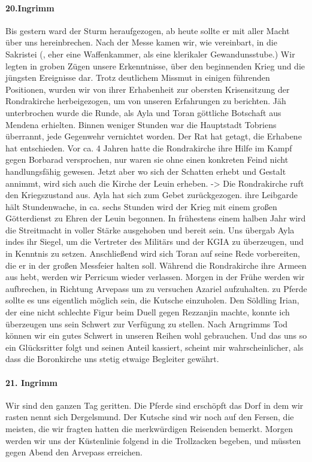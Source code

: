 \paragraph{20.Ingrimm}
Bis gestern ward der Sturm heraufgezogen, ab heute sollte er mit aller Macht über uns hereinbrechen.
Nach der Messe kamen wir, wie vereinbart, in die Sakristei (, eher eine Waffenkammer, als eine klerikaler Gewandunsstube.) Wir legten in groben Zügen unsere Erkenntnisse, über den beginnenden Krieg und die jüngsten Ereignisse dar. Trotz deutlichem Missmut in einigen führenden Positionen, wurden wir von ihrer Erhabenheit zur obersten Krisensitzung der Rondrakirche herbeigezogen, um von unseren Erfahrungen zu berichten.
Jäh unterbrochen wurde die Runde, als Ayla und Toran göttliche Botschaft aus Mendena erhielten. Binnen weniger Stunden war die Hauptstadt Tobriens überrannt, jede Gegenwehr vernichtet worden.
Der Rat hat getagt, die Erhabene hat entschieden. Vor ca. 4 Jahren hatte die Rondrakirche ihre Hilfe im Kampf gegen Borbarad versprochen, nur waren sie ohne einen konkreten Feind nicht handlungsfähig gewesen. Jetzt aber wo sich der Schatten erhebt und Gestalt annimmt, wird sich auch die Kirche der Leuin erheben. -> Die Rondrakirche ruft den Kriegszustand aus.
Ayla hat sich zum Gebet zurückgezogen. ihre Leibgarde hält Stundenwache, in ca. sechs Stunden wird der Krieg mit einem großen Götterdienst zu Ehren der Leuin begonnen. In frühestens einem halben Jahr wird die Streitmacht in voller Stärke ausgehoben und bereit sein.
Uns übergab Ayla indes ihr Siegel, um die Vertreter des Militärs und der KGIA zu überzeugen, und in Kenntnis zu setzen. Anschließend wird sich Toran auf seine Rede vorbereiten, die er in der großen Messfeier halten soll.
Während die Rondrakirche ihre Armeen aus hebt, werden wir Perricum wieder verlassen. Morgen in der Frühe werden wir aufbrechen, in Richtung Arvepass um zu versuchen Azariel aufzuhalten. zu Pferde sollte es uns eigentlich möglich sein, die Kutsche einzuholen.
Den Söldling Irian, der eine nicht schlechte Figur beim Duell gegen Rezzanjin machte, konnte ich überzeugen uns sein Schwert zur Verfügung zu stellen. Nach Arngrimms Tod können wir ein gutes Schwert in unseren Reihen wohl gebrauchen. Und das uns so ein Glücksritter folgt und seinen Anteil kassiert, scheint mir wahrscheinlicher, als dass die Boronkirche uns stetig etwaige Begleiter gewährt.

\paragraph{21. Ingrimm}
Wir sind den ganzen Tag geritten. Die Pferde sind erschöpft das Dorf in dem wir rasten nennt sich Dergelsmund. Der Kutsche sind wir noch auf den Fersen, die meisten, die wir fragten hatten die merkwürdigen Reisenden bemerkt.
Morgen werden wir uns der Küstenlinie folgend in die Trollzacken begeben, und müssten gegen Abend den Arvepass erreichen.

